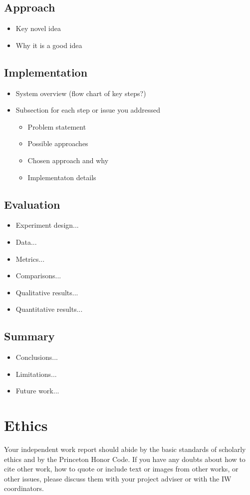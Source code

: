 \documentclass[pageno]{jpaper}
\begin{document}
\subsection{Approach}
\begin{itemize}
\item Key novel idea
\item Why it is a good idea
\end{itemize}

\subsection{Implementation}
\begin{itemize}
\item System overview (flow chart of key steps?)
\item Subsection for each step or issue you addressed
\begin{itemize}
\item Problem statement
\item Possible approaches
\item Chosen approach and why
\item Implementaton details
\end{itemize}
\end{itemize}

\subsection{Evaluation}
\begin{itemize}
\item Experiment design...
\item Data...
\item Metrics...
\item Comparisons...
\item Qualitative results...
\item Quantitative results...
\end{itemize}

\subsection{Summary}
\begin{itemize}
\item Conclusions...
\item Limitations...
\item Future work...
\end{itemize}


\section{Ethics}

Your independent work report should abide by the basic standards of scholarly ethics and by the Princeton Honor Code. If you have any doubts about how to cite
other work, how to quote or include text or images from other works, or other issues, please discuss them with your project adviser or with the IW coordinators. 





\end{document}
